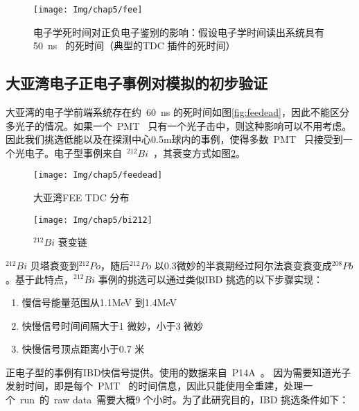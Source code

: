 \begin{figure}[!htbp]
  \centering
   \texttt{[image: Img/chap5/fee]}
    \caption{电子学死时间对正负电子鉴别的影响：假设电子学时间读出系统具有50~ns~ 的死时间（典型的TDC 插件的死时间）}
  \label{fig:p511}
\end{figure}

\subsection{大亚湾电子正电子事例对模拟的初步验证}
大亚湾的电子学前端系统存在约~60~ns 的死时间如图\ref{fig:feedead}，因此不能区分多光子的情况。如果一个~PMT~ 只有一个光子击中，则这种影响可以不用考虑。因此我们挑选低能以及在探测中心0.5m球内的事例，使得多数~PMT~ 只接受到一个光电子。电子型事例来自~$^{212}Bi$~，其衰变方式如图\ref{fig:bi212}。
\begin{figure}[!htbp]
\begin{minipage}[t]{0.48\linewidth}
    \centering
    \texttt{[image: Img/chap5/feedead]}
    \caption{大亚湾FEE TDC 分布}
    \label{fig:feedead}
\end{minipage}
\quad\quad
\begin{minipage}[t]{0.48\linewidth}
    \centering
    \texttt{[image: Img/chap5/bi212]}
    \caption{$^{212}Bi$ 衰变链}
    \label{fig:bi212}
\end{minipage}
\end{figure}
$^{212}Bi$ 贝塔衰变到$^{212}Po$，随后$^{212}Po$ 以0.3微妙的半衰期经过阿尔法衰变衰变成$^{208}Pb$ 。基于此特点，$^{212}Bi$ 事例的挑选可以通过类似IBD 挑选的以下步骤实现：
\begin{enumerate}
\item 慢信号能量范围从1.1MeV 到1.4MeV
\item 快慢信号时间间隔大于1 微妙，小于3 微妙
\item 快慢信号顶点距离小于0.7 米
\end{enumerate}
正电子型的事例有IBD快信号提供。使用的数据来自~P14A~。 因为需要知道光子发射时间，即是每个~PMT~ 的时间信息，因此只能使用全重建，处理一个~run~的~raw data~需要大概9 个小时。为了此研究目的，IBD 挑选条件如下：
